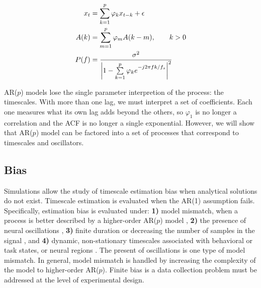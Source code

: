\documentclass[pdflatex,lineno,sn-nature]{sn-jnl}
\theoremstyle{thmstyleone}
\theoremstyle{thmstyletwo}
\theoremstyle{thmstylethree}
\begin{document}
\begin{align}
x_t &= \sum_{k=1}^p \varphi_k x_{t-k} + \epsilon \label{eq:arp} \\
A(k) &= \sum_{m=1}^p \varphi_m A(k-m), \qquad k > 0 \label{eq:arp_acf} \\
P(f) &= \frac{\sigma^{2}}{\left|1 - \sum\limits_{k=1}^p \varphi_{k} e\strut^{-j 2 \pi f k / f_s}\right|^{2}} \label{eq:arp_psd}
\end{align}

AR($p$) models lose the single parameter interpretion of the process: the timescales. With more than one lag, we must interpret a set of coefficients. Each one measures what its own lag adds beyond the others, so $\varphi_1$ is no longer a correlation and the ACF is no longer a single exponential. However, we will show that AR($p$) model can be factored into a set of processes that correspond to timescales and oscillators.

\subsection{Bias}\label{sec:bias}

Simulations allow the study of timescale estimation bias when analytical solutions do not exist. Timescale estimation is evaluated when the AR(1) assumption fails. Specifically, estimation bias is evaluated under: \textbf{1)} model mismatch, when a process is better described by a higher-order AR($p$) model \cite{broersen_finite_2000}, \textbf{2)} the presence of neural oscillations \cite{berger_uber_1929, buzsaki_neuronal_2004}, \textbf{3)} finite duration or decreasing the number of samples in the signal \cite{broersen_finite_2000, schwarz_estimating_1978, zeraati_flexible_2022}, and \textbf{4)} dynamic, non-stationary timescales associated with behavioral or task states, or neural regions \cite{gao_neuronal_2020, spitmaan_multiple_2020}. The present of oscillations is one type of model mismatch. In general, model mismatch is handled by increasing the complexity of the model to higher-order AR($p$). Finite bias is a data collection problem must be addressed at the level of experimental design.
\end{document}
